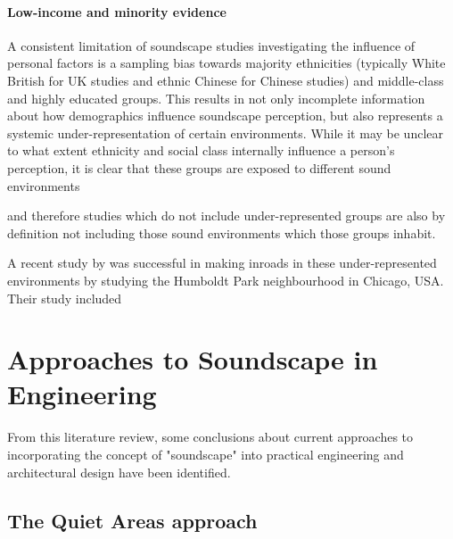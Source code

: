 \paragraph*{Low-income and minority evidence} %
A consistent limitation of soundscape studies investigating the influence of personal factors is a sampling bias towards majority ethnicities (typically White British for UK studies and ethnic Chinese for Chinese studies) and middle-class and highly educated groups. %
This results in not only incomplete information about how demographics influence soundscape perception, but also represents a systemic under-representation of certain environments. While it may be unclear to what extent ethnicity and social class internally influence a person's perception, it is clear that these groups are exposed to different sound environments %

and therefore studies which do not include under-represented groups are also by definition not including those sound environments which those groups inhabit.

A recent study by  was successful in making inroads in these under-represented environments by studying the Humboldt Park neighbourhood in Chicago, USA. Their study included


\section{Approaches to Soundscape in Engineering}

From this literature review, some conclusions about current approaches to incorporating the concept of "soundscape" into practical engineering and architectural design have been identified.

\subsection{The Quiet Areas approach}

